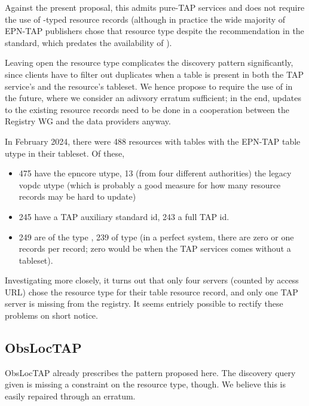 \documentclass[11pt,a4paper]{ivoa}
\begin{document}
Against the present proposal, this admits pure-TAP services and does not
require the use of -typed resource records
(although in practice the wide majority of EPN-TAP publishers chose
that resource type despite the recommendation in the standard, which
predates the availability of ).


Leaving open the resource type complicates
the discovery pattern significantly, since clients have
to filter out duplicates when a table is present in both the TAP
service's and the resource's tableset.  We hence propose to require the
use of  in the future,
where we consider an adivsory erratum sufficient;
in the end, updates to the existing resource records need to be done in
a cooperation between the Registry WG and the data providers anyway.

In February 2024, there were 488 resources with tables with the EPN-TAP
table utype in their tableset.  Of these,

\begin{itemize}
\item 475 have the epncore utype, 13 (from four different authorities)
the legacy vopdc utype (which is probably a good measure for how many
resource records may be hard to update)
\item 245 have a TAP auxiliary standard id, 243 a full TAP id.
\item 249 are of the type , 239 of type
 (in a perfect system, there are zero or one
 records per  record;
zero would be when the TAP services comes without a tableset).
\end{itemize}

Investigating more closely, it turns out that only four servers (counted by
access URL) chose the  resource type for
their table resource record, and only one TAP server is missing from the
registry.  It seems entriely possible to rectify these problems on short
notice.

\subsection{ObsLocTAP}

ObsLocTAP \citep{2021ivoa.spec.0724S} already prescribes the pattern
proposed here. The discovery query given is missing a constraint on the
resource type, though.  We believe this is easily repaired through an
erratum.
\end{document}
